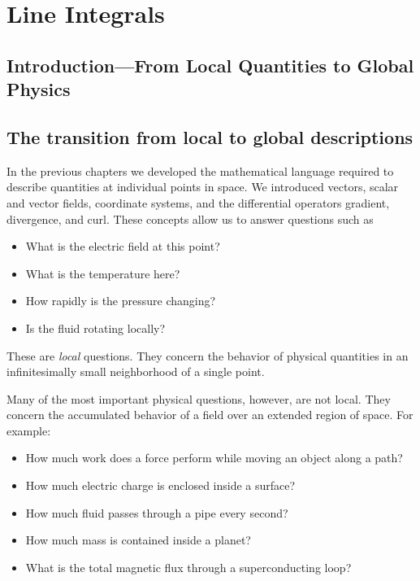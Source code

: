 \section{Line Integrals}
\label{sec:line-integrals}
\subsection{Introduction---From Local Quantities to Global Physics}
\label{sec:local-to-global-physics}

\subsection{The transition from local to global descriptions}

In the previous chapters we developed the mathematical language required to
describe quantities at individual points in space. We introduced vectors,
scalar and vector fields, coordinate systems, and the differential operators
gradient, divergence, and curl. These concepts allow us to answer questions
such as

\begin{itemize}
  \item What is the electric field at this point?
  \item What is the temperature here?
  \item How rapidly is the pressure changing?
  \item Is the fluid rotating locally?
\end{itemize}

These are \emph{local} questions. They concern the behavior of physical
quantities in an infinitesimally small neighborhood of a single point.

Many of the most important physical questions, however, are not local. They
concern the accumulated behavior of a field over an extended region of space.
For example:

\begin{itemize}
  \item How much work does a force perform while moving an object along a path?
  \item How much electric charge is enclosed inside a surface?
  \item How much fluid passes through a pipe every second?
  \item How much mass is contained inside a planet?
  \item What is the total magnetic flux through a superconducting loop?
\end{itemize}

